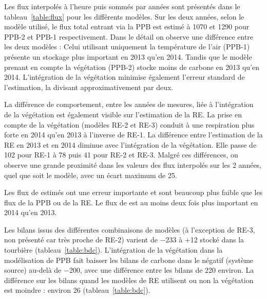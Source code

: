 Les flux interpolés à l'heure puis sommés par années sont présentés dans le tableau~\ref{table:flux} pour les différents modèles.
Sur les deux années, selon le modèle utilisé, le flux total entrant via la PPB est estimé à 1070 et \SI{1290}{\gcma} pour PPB-2 et PPB-1 respectivement.
Dans le détail on observe une différence entre les deux modèles : 
Celui utilisant uniquement la température de l'air (PPB-1) présente un stockage plus important en 2013 qu'en 2014.
Tandis que le modèle prenant en compte la végétation (PPB-2) stocke moins de carbone en 2013 qu'en 2014.
L'intégration de la végétation minimise également l'erreur standard de l'estimation, la divisant approximativement par deux.

La différence de comportement, entre les années de mesures, liée à l'intégration de la végétation est également visible sur l'estimation de la RE.
La prise en compte de la végétation (modèles RE-2 et RE-3) conduit à une respiration plus forte en 2014 qu'en 2013 à l'inverse de RE-1.
La différence entre l'estimation de la RE en 2013 et en 2014 diminue avec l'intégration de la végétation.
Elle passe de 102 pour RE-1 à 78 puis 41 pour RE-2 et RE-3.
Malgré ces différences, on observe une grande proximité dans les valeurs des flux interpolés sur les 2 années, quel  que soit le modèle, avec un écart maximum de \SI{25}{\gcma}.

Les flux de \chh estimés ont une erreur importante et sont beaucoup plus faible que les flux de la PPB ou de la RE.
Le flux de \chh est au moins deux fois plus important en 2014 qu'en 2013.

Les bilans issus des différentes combinaisons de modèles (à l'exception de RE-3, non présenté car très proche de RE-2) varient de \SI{-233}{\gcma} à +\SI{12}{\gcma} stocké dans la tourbière (tableau~\ref{table:bdc}).
L'intégration de la végétation dans la modélisation de PPB fait baisser les bilans de carbone dans le négatif (système source) au-delà de \SI{-200}{\gcma}, avec une différence entre les bilans de \SI{220}{\gcma} environ.
La différence sur les bilans quand les modèles de RE utilisent ou non la végétation est moindre : environ \SI{26}{\gcma} (tableau~\ref{table:bdc}).

